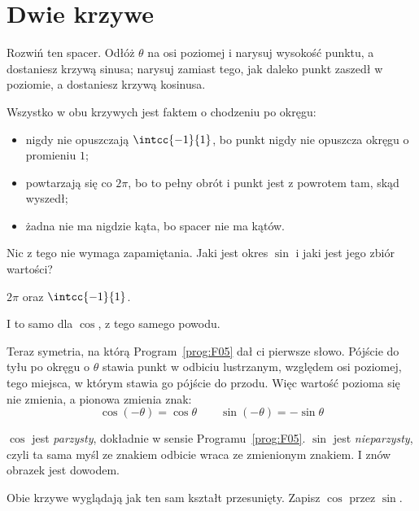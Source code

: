 \section{Dwie krzywe}
\label{sec:F08-curves}

\begin{fr}
Rozwiń ten spacer. Odłóż $\theta$ na osi poziomej i narysuj wysokość punktu, a
dostaniesz krzywą sinusa; narysuj zamiast tego, jak daleko punkt zaszedł w
poziomie, a dostaniesz krzywą kosinusa.

Wszystko w obu krzywych jest faktem o chodzeniu po okręgu:

\begin{itemize}
\item nigdy nie opuszczają $\intcc{-1}{1}$, bo punkt nigdy nie opuszcza
  okręgu o promieniu $1$;
\item powtarzają się co $2\pi$, bo to pełny obrót i punkt jest z powrotem
  tam, skąd wyszedł;
\item żadna nie ma nigdzie kąta, bo spacer nie ma kątów.
\end{itemize}

Nic z tego nie wymaga zapamiętania. Jaki jest okres $\sin$ i jaki jest jego
zbiór wartości?
\nextframe
\end{fr}

\begin{fr}
\begin{ansblock}
$2\pi$ oraz $\intcc{-1}{1}$.
\end{ansblock}

I to samo dla $\cos$, z tego samego powodu.

Teraz symetria, na którą Program~\ref{prog:F05} dał ci pierwsze słowo.
Pójście do tyłu po okręgu o $\theta$ stawia punkt w odbiciu lustrzanym,
względem osi poziomej,
tego miejsca, w którym stawia go pójście do przodu. Więc wartość pozioma się
nie zmienia, a pionowa zmienia znak:
\[ \cos(-\theta) = \cos\theta \qquad \sin(-\theta) = -\sin\theta \]

$\cos$ jest \emph{parzysty}, dokładnie w sensie Programu~\ref{prog:F05}.
$\sin$ jest \emph{nieparzysty}, czyli ta sama myśl ze znakiem \dash{} odbicie
wraca ze zmienionym znakiem. I znów obrazek jest dowodem.

Obie krzywe wyglądają jak ten sam kształt przesunięty. Zapisz $\cos$ przez
$\sin$.
\nextframe
\end{fr}


